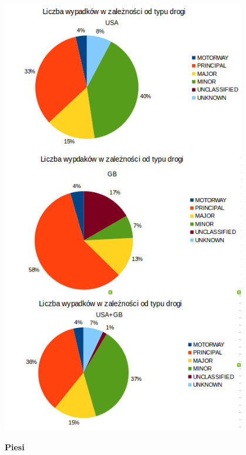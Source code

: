 \centerline{\includegraphics[width=0.8\textwidth]{images/statistics/road_type.png}}

\textbf{Piesi}

